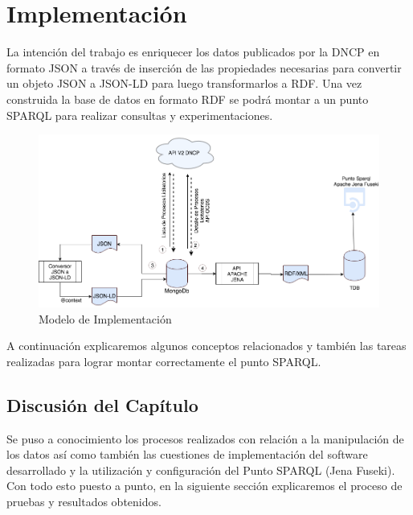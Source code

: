 \chapter{Implementación}
\label{chap:Implementación de la Ontologia}


La intención del trabajo es enriquecer los datos publicados por la DNCP en formato JSON a través de inserción de las propiedades necesarias para convertir un objeto JSON a JSON-LD para luego transformarlos a RDF. Una vez construida la base de datos en formato RDF se podrá montar a un punto SPARQL para realizar consultas y experimentaciones.


\begin{figure}[h!]
   \centering
   \includegraphics[width=150mm]{figuras/Diagramas-Implementacion.png}

   \caption{Modelo de Implementación}
   \label{img:modelo de Implementacion}
\end{figure}

A continuación explicaremos algunos conceptos relacionados y también las tareas realizadas para lograr montar correctamente el punto SPARQL.















 \section{Discusión del Capítulo }

 Se puso a conocimiento los procesos realizados con relación a la manipulación de los datos así como también las cuestiones de implementación del software desarrollado y la utilización y configuración del Punto SPARQL (Jena Fuseki). Con todo esto puesto a punto, en la siguiente sección explicaremos el proceso de pruebas y resultados obtenidos.



